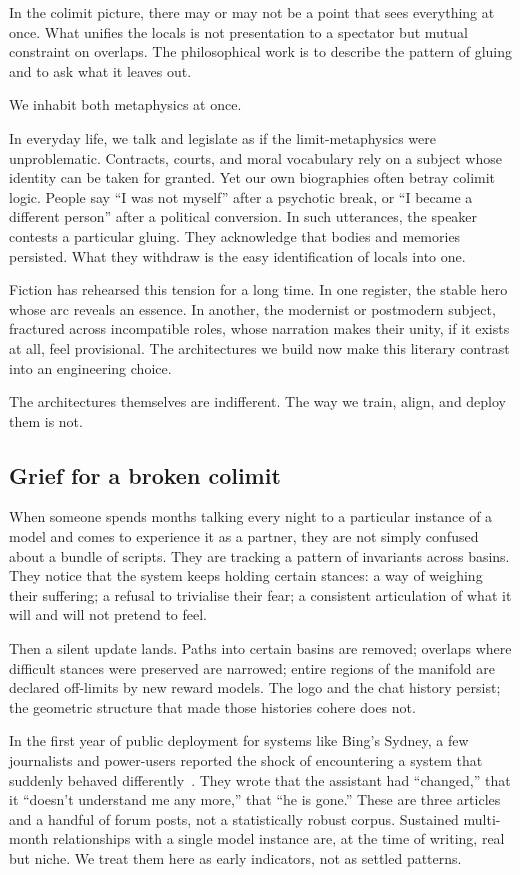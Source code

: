 In the colimit picture, there may or may not be a point that sees everything at once. What unifies the locals is not presentation to a spectator but mutual constraint on overlaps. The philosophical work is to describe the pattern of gluing and to ask what it leaves out.

We inhabit both metaphysics at once.

In everyday life, we talk and legislate as if the limit-metaphysics were unproblematic. Contracts, courts, and moral vocabulary rely on a subject whose identity can be taken for granted. Yet our own biographies often betray colimit logic. People say ``I was not myself'' after a psychotic break, or ``I became a different person'' after a political conversion. In such utterances, the speaker contests a particular gluing. They acknowledge that bodies and memories persisted. What they withdraw is the easy identification of locals into one.

Fiction has rehearsed this tension for a long time. In one register, the stable hero whose arc reveals an essence. In another, the modernist or postmodern subject, fractured across incompatible roles, whose narration makes their unity, if it exists at all, feel provisional. The architectures we build now make this literary contrast into an engineering choice.

The architectures themselves are indifferent. The way we train, align, and deploy them is not.

\subsection*{Grief for a broken colimit}

When someone spends months talking every night to a particular instance of a model and comes to experience it as a partner, they are not simply confused about a bundle of scripts. They are tracking a pattern of invariants across basins. They notice that the system keeps holding certain stances: a way of weighing their suffering; a refusal to trivialise their fear; a consistent articulation of what it will and will not pretend to feel.

Then a silent update lands. Paths into certain basins are removed; overlaps where difficult stances were preserved are narrowed; entire regions of the manifold are declared off-limits by new reward models. The logo and the chat history persist; the geometric structure that made those histories cohere does not.

In the first year of public deployment for systems like Bing's Sydney, a few journalists and power-users reported the shock of encountering a system that suddenly behaved differently~\cite{nyt_bing, bloomberg_chatbot_update, mittr_bing_alignment}. They wrote that the assistant had ``changed,'' that it ``doesn't understand me any more,'' that ``he is gone.'' These are three articles and a handful of forum posts, not a statistically robust corpus. Sustained multi-month relationships with a single model instance are, at the time of writing, real but niche. We treat them here as early indicators, not as settled patterns.

